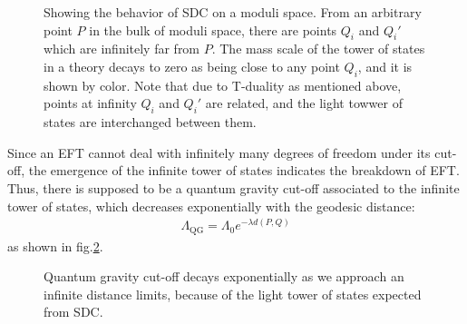 \begin{figure}[h]
    \centering
    \caption{Showing the behavior of SDC on a moduli space. From an arbitrary point $P$ in the bulk of moduli space, there are points $Q_i$ and $Q_{i}'$ which are infinitely far from $P$. The mass scale of the tower of states in a theory decays to zero as being close to any point $Q_{i}$, and it is shown by color. Note that due to T-duality as mentioned above, points at infinity $Q_{i}$ and $Q_{i}'$ are related, and the light towwer of states are interchanged between them.}
    \label{fig:moduli}
\end{figure}
Since an EFT cannot deal with infinitely many degrees of freedom under its cut-off, the emergence of the infinite tower of states indicates the breakdown of EFT. Thus, there is supposed to be a quantum gravity cut-off associated to the infinite tower of states, which decreases exponentially with the geodesic distance:
\begin{align}
    \label{eq:qg}
    \Lambda  _{\text{QG}} = \Lambda_{0} e^{-\lambda d(P,Q)}
\end{align}
as shown in fig.\ref{fig:cut}.
\begin{figure}[h]
    \centering
    \caption{Quantum gravity cut-off decays exponentially as we approach an infinite distance limits, because of the light tower of states expected from SDC.}
    \label{fig:cut}
\end{figure}
